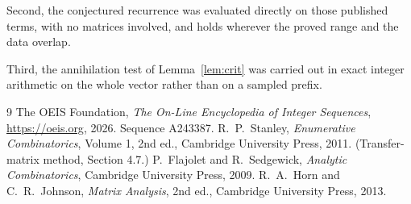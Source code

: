 \documentclass[11pt,a4paper]{article}
\theoremstyle{plain}
\theoremstyle{definition}
\begin{document}
Second, the conjectured recurrence was evaluated directly on those published terms, with no
matrices involved, and holds wherever the proved range and the data overlap.

Third, the annihilation test of Lemma~\ref{lem:crit} was carried out in exact integer
arithmetic on the whole vector rather than on a sampled prefix.

\begin{thebibliography}{9}
 The OEIS Foundation, \emph{The On-Line Encyclopedia of Integer
Sequences}, \url{https://oeis.org}, 2026. Sequence A243387.
 R.~P.~Stanley, \emph{Enumerative Combinatorics}, Volume 1, 2nd ed.,
Cambridge University Press, 2011. (Transfer-matrix method, Section 4.7.)
 P.~Flajolet and R.~Sedgewick, \emph{Analytic Combinatorics}, Cambridge
University Press, 2009.
 R.~A.~Horn and C.~R.~Johnson, \emph{Matrix Analysis}, 2nd ed., Cambridge
University Press, 2013.
\end{thebibliography}
\end{document}
